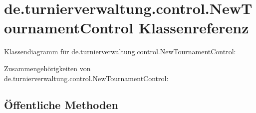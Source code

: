 \hypertarget{classde_1_1turnierverwaltung_1_1control_1_1_new_tournament_control}{}\section{de.\+turnierverwaltung.\+control.\+New\+Tournament\+Control Klassenreferenz}
\label{classde_1_1turnierverwaltung_1_1control_1_1_new_tournament_control}


Klassendiagramm für de.\+turnierverwaltung.\+control.\+New\+Tournament\+Control\+:


Zusammengehörigkeiten von de.\+turnierverwaltung.\+control.\+New\+Tournament\+Control\+:
\subsection*{Öffentliche Methoden}
